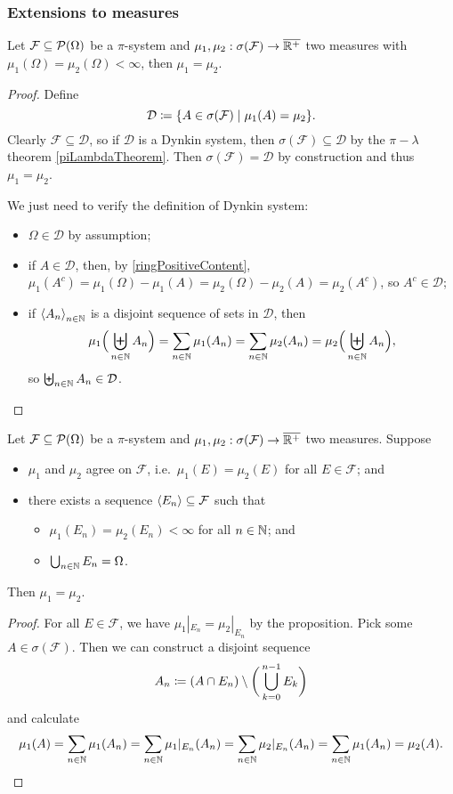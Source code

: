 \subsubsection{Extensions to measures}
\begin{proposition}
Let $\mathcal{F}\subseteq \operatorname{\mathcal{P}}(\Omega)$ be a $\pi$-system and $\mu_1, \mu_2: \sigma(\mathcal{F}) \to \overline{\mathbb{R}^+}$ two measures with $\mu_1(\Omega) = \mu_2(\Omega) < \infty$, then $\mu_1 = \mu_2$.
\end{proposition}
\begin{proof}
Define
\[ \mathcal{D} \defeq \setbuilder{A\in \sigma(\mathcal{F})}{\mu_1(A) = \mu_2}. \]
Clearly $\mathcal{F} \subseteq \mathcal{D}$, so if $\mathcal{D}$ is a Dynkin system, then $\sigma(\mathcal{F}) \subseteq \mathcal{D}$ by the $\pi-\lambda$ theorem \ref{piLambdaTheorem}. Then $\sigma(\mathcal{F}) = \mathcal{D}$ by construction and thus $\mu_1 = \mu_2$.

We just need to verify the definition of Dynkin system:
\begin{itemize}
\item $\Omega\in\mathcal{D}$ by assumption;
\item if $A\in\mathcal{D}$, then, by \ref{ringPositiveContent}, $\mu_1(A^c) = \mu_1(\Omega) - \mu_1(A) = \mu_2(\Omega) - \mu_2(A) = \mu_2(A^c)$, so $A^c\in \mathcal{D}$;
\item if $\left\langle A_n \right\rangle_{n\in\mathbb{N}}$ is a disjoint sequence of sets in $\mathcal{D}$, then
\[ \mu_1\Big(\biguplus_{n\in\mathbb{N}}A_n\Big) = \sum_{n\in\mathbb{N}}\mu_1(A_n) = \sum_{n\in\mathbb{N}}\mu_2(A_n) = \mu_2\Big(\biguplus_{n\in\mathbb{N}}A_n\Big), \]
so $\biguplus_{n\in\mathbb{N}}A_n\in\mathcal{D}$.
\end{itemize}
\end{proof}
\begin{corollary} \label{sigmaFiniteUniqueExtension}
Let $\mathcal{F}\subseteq \operatorname{\mathcal{P}}(\Omega)$ be a $\pi$-system and $\mu_1, \mu_2: \sigma(\mathcal{F}) \to \overline{\mathbb{R}^+}$ two measures. Suppose
\begin{itemize}
\item $\mu_1$ and $\mu_2$ agree on $\mathcal{F}$, i.e.\ $\mu_1(E) = \mu_2(E)$ for all $E\in\mathcal{F}$; and
\item there exists a sequence $\left\langle E_n \right\rangle\subseteq \mathcal{F}$ such that
\begin{itemize}
\item $\mu_1(E_n) = \mu_2(E_n) < \infty$ for all $n\in\mathbb{N}$; and
\item $\bigcup_{n\in\mathbb{N}} E_n = \Omega$.
\end{itemize}
\end{itemize}
Then $\mu_1 = \mu_2$.
\end{corollary}
\begin{proof}
For all $E\in \mathcal{F}$, we have $\mu_1|_{E_n} = \mu_2|_{E_n}$ by the proposition. Pick some $A\in \sigma(\mathcal{F})$. Then we can construct a disjoint sequence
\[ A_n \coloneqq (A\cap E_n)\setminus \bigg(\bigcup_{k=0}^{n-1}E_k\bigg) \]
and calculate
\[ \mu_1(A) = \sum_{n\in \mathbb{N}}\mu_1(A_n) = \sum_{n\in \mathbb{N}}\mu_1|_{E_n}(A_n) = \sum_{n\in \mathbb{N}}\mu_2|_{E_n}(A_n) = \sum_{n\in \mathbb{N}}\mu_1(A_n) = \mu_2(A). \]
\end{proof}

